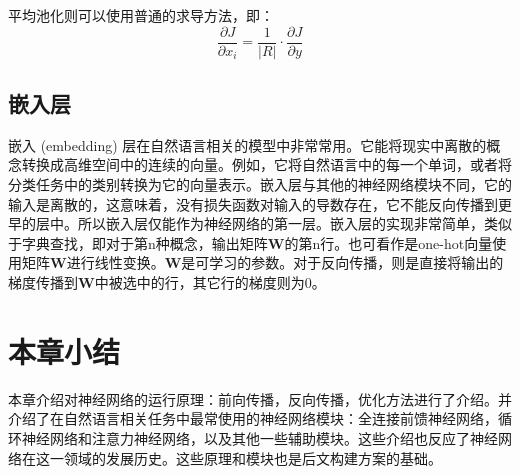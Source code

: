 平均池化则可以使用普通的求导方法，即：
\begin{equation}
    \frac{\partial J}{\partial x_i}=\frac{1}{\left|R\right|}\cdot\frac{\partial J}{\partial y}
\end{equation}

\subsection{嵌入层}

嵌入 (embedding) 层在自然语言相关的模型中非常常用。它能将现实中离散的概念转换成高维空间中的连续的向量。例如，它将自然语言中的每一个单词，或者将分类任务中的类别转换为它的向量表示。嵌入层与其他的神经网络模块不同，它的输入是离散的，这意味着，没有损失函数对输入的导数存在，它不能反向传播到更早的层中。所以嵌入层仅能作为神经网络的第一层。嵌入层的实现非常简单，类似于字典查找，即对于第n种概念，输出矩阵$\bm{W}$的第n行。也可看作是one-hot向量使用矩阵$\bm{W}$进行线性变换。$\bm{W}$是可学习的参数。对于反向传播，则是直接将输出的梯度传播到$\bm{W}$中被选中的行，其它行的梯度则为0。

\section{本章小结}

本章介绍对神经网络的运行原理：前向传播，反向传播，优化方法进行了介绍。并介绍了在自然语言相关任务中最常使用的神经网络模块：全连接前馈神经网络，循环神经网络和注意力神经网络，以及其他一些辅助模块。这些介绍也反应了神经网络在这一领域的发展历史。这些原理和模块也是后文构建方案的基础。
